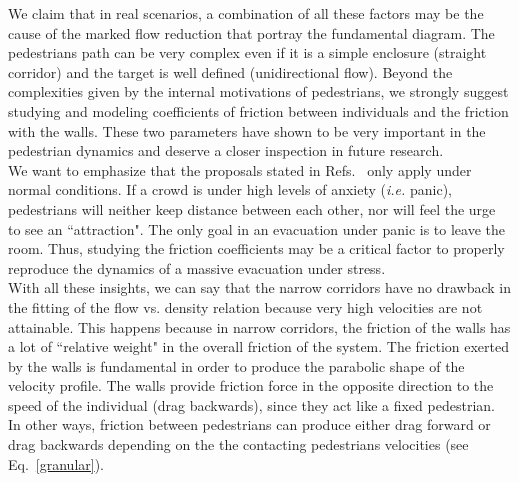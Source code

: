 We claim that in real scenarios, a combination of all these factors may be the cause of the marked flow reduction that portray the fundamental diagram. The pedestrians path can be very complex even if it is a simple enclosure (straight corridor) and the target is well defined (unidirectional flow). Beyond the complexities given by the internal motivations of pedestrians, we strongly suggest studying and modeling coefficients of friction between individuals and the friction with the walls. These two parameters have shown to be very important in the pedestrian dynamics and deserve a closer inspection in future research.\\

We want to emphasize that the proposals stated in Refs.~\cite{parisi2,johansson,kwak}  only apply under normal conditions. If a crowd is under high levels of anxiety (\textit{i.e.} panic), pedestrians will neither keep distance between each other, nor will feel the urge to see an ``attraction". The only goal in an evacuation under panic is to leave the room. Thus, studying the friction coefficients may be a critical factor to properly reproduce the dynamics of a massive evacuation under stress.\\

With all these insights, we can say that the narrow corridors have no drawback in the fitting of the flow vs. density relation because very high velocities are not attainable. This happens because in narrow corridors, the friction of the walls has a lot of ``relative weight" in the overall friction of the system. 
The friction exerted by the walls is fundamental in order to produce the parabolic shape of the velocity profile. The walls provide friction force in the opposite direction to the speed of the individual (drag backwards), since they act like a fixed pedestrian. In other ways, friction between pedestrians can produce either drag forward or drag backwards depending on the the contacting pedestrians velocities (see Eq.~\ref{granular}).\\


